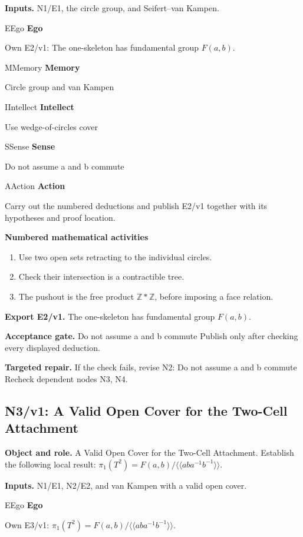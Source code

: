 \documentclass[preprint,12pt,aps,pra,showkeys,amsmath,amssymb,superscriptaddress,floatfix]{revtex4-2}
\theoremstyle{definition}
\theoremstyle{remark}
\newcommand{\mmfaculty}[3]{%
 \begin{mmfacultybox}{#1}{#2}
 {\sffamily\bfseries\color{MMBlue}#2}\par\smallskip #3
 \end{mmfacultybox}}
\newcommand{\field}[2]{\par\smallskip\noindent\textbf{#1.} #2\par}
\begin{document}
\field{Inputs}{N1/E1, the circle group, and Seifert--van Kampen.}

\mmfaculty{E}{Ego}{Own E2/v1: The one-skeleton has fundamental group \(F(a,b)\).}

\mmfaculty{M}{Memory}{Circle group and van Kampen}

\mmfaculty{I}{Intellect}{Use wedge-of-circles cover}

\mmfaculty{S}{Sense}{Do not assume a and b commute}

\mmfaculty{A}{Action}{Carry out the numbered deductions and publish E2/v1 together with its
hypotheses and proof location.}

\smallskip\noindent\textbf{Numbered mathematical activities}

\begin{enumerate}[label=N2.\arabic*,leftmargin=3.4em]

\item Use two open sets retracting to the individual circles.

\item Check their intersection is a contractible tree.

\item The pushout is the free product \(\mathbb Z*\mathbb Z\), before imposing
a face relation.

\end{enumerate}

\field{Export E2/v1}{The one-skeleton has fundamental group \(F(a,b)\).}

\field{Acceptance gate}{Do not assume a and b commute Publish only after checking every
displayed deduction.}

\field{Targeted repair}{If the check fails, revise N2: Do not assume a and b commute Recheck
dependent nodes N3, N4.}

\clearpage

\subsection{N3/v1: A Valid Open Cover for the Two-Cell Attachment}

\field{Object and role}{A Valid Open Cover for the Two-Cell Attachment. Establish the following
local result:
\(\pi_1(T^2)=F(a,b)/\langle\!\langle aba^{-1}b^{-1}\rangle\!\rangle\).}

\field{Inputs}{N1/E1, N2/E2, and van Kampen with a valid open cover.}

\mmfaculty{E}{Ego}{Own E3/v1:
\(\pi_1(T^2)=F(a,b)/\langle\!\langle aba^{-1}b^{-1}\rangle\!\rangle\).}
\end{document}
